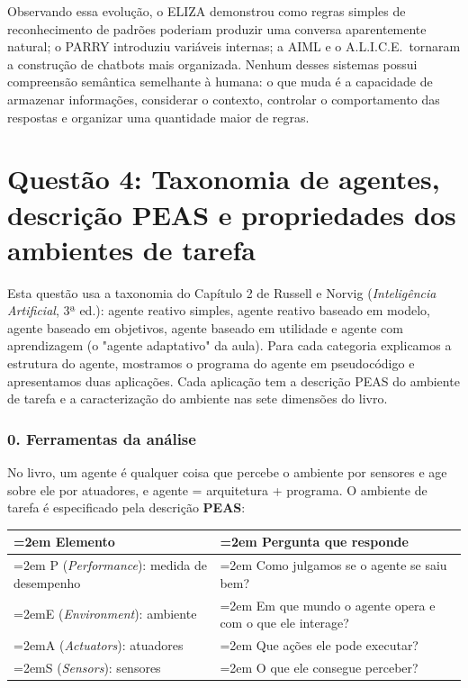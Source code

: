 \documentclass[12pt, a4paper]{article}
\begin{document}
Observando essa evolução, o ELIZA demonstrou como regras simples de reconhecimento de padrões poderiam produzir uma conversa aparentemente natural; o PARRY introduziu variáveis internas; a AIML e o A.L.I.C.E.\ tornaram a construção de chatbots mais organizada. Nenhum desses sistemas possui compreensão semântica semelhante à humana: o que muda é a capacidade de armazenar informações, considerar o contexto, controlar o comportamento das respostas e organizar uma quantidade maior de regras.

\section{Questão 4: Taxonomia de agentes, descrição PEAS e propriedades dos ambientes de tarefa}
\label{sec:q4}

Esta questão usa a taxonomia do Capítulo 2 de Russell e Norvig (\emph{Inteligência Artificial}, 3ª ed.): agente reativo simples, agente reativo baseado em modelo, agente baseado em objetivos, agente baseado em utilidade e agente com aprendizagem (o "agente adaptativo" da aula). Para cada categoria explicamos a estrutura do agente, mostramos o programa do agente em pseudocódigo e apresentamos duas aplicações. Cada aplicação tem a descrição PEAS do ambiente de tarefa e a caracterização do ambiente nas sete dimensões do livro.

\subsubsection{0. Ferramentas da análise}\label{0-ferramentas-da-anuxe1lise}

No livro, um agente é qualquer coisa que percebe o ambiente por sensores e age sobre ele por atuadores, e agente = arquitetura + programa. O ambiente de tarefa é especificado pela descrição \textbf{PEAS}:

\begingroup
\setlength{\tabcolsep}{4.0pt}
\begin{longtable}{@{}>{\raggedright\hyphenpenalty=30\tolerance=999\emergencystretch=2em\arraybackslash}p{6.33cm}>{\raggedright\hyphenpenalty=30\tolerance=999\emergencystretch=2em\arraybackslash}p{8.67cm}@{}}
\toprule\noalign{}
Elemento & Pergunta que responde \\
\midrule\noalign{}
\endhead
\bottomrule\noalign{}
\endlastfoot
P (\emph{Performance}): medida de desempenho & Como julgamos se o agente se saiu bem? \\
E (\emph{Environment}): ambiente & Em que mundo o agente opera e com o que ele interage? \\
A (\emph{Actuators}): atuadores & Que ações ele pode executar? \\
S (\emph{Sensors}): sensores & O que ele consegue perceber? \\
\end{longtable}
\endgroup
\end{document}
